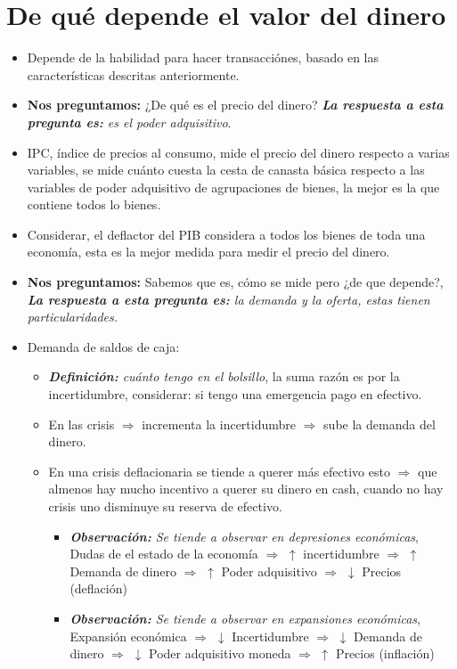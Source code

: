 \section{De qué depende el valor del dinero}
\begin{itemize}
    \item Depende de la habilidad para hacer transacciónes, basado en las características descritas anteriormente.
    \item \textbf{Nos preguntamos:} ¿De qué es el precio del dinero? \emph{\textbf{La respuesta a esta pregunta es: }es el poder adquisitivo}.
    \item IPC, índice de precios al consumo, mide el precio del dinero respecto a varias variables, se mide cuánto cuesta la cesta de canasta básica respecto a las variables de poder adquisitivo de agrupaciones de bienes, la mejor es la que contiene todos lo bienes.
    \item Considerar, el deflactor del PIB considera a todos los bienes de toda una economía, esta es la mejor medida para medir el precio del dinero.
    \item \textbf{Nos preguntamos:} Sabemos que es, cómo se mide pero ¿de que depende?, \emph{\textbf{La respuesta a esta pregunta es: }la demanda y la oferta, estas tienen particularidades.}
    \item Demanda de saldos de caja: 
        \begin{itemize}
            \item \emph{\textbf{Definición:} cuánto tengo en el bolsillo}, la suma razón es por la incertidumbre, considerar: si tengo una emergencia pago en efectivo.
            \item En las crisis $\Rightarrow$ incrementa la incertidumbre $\Rightarrow$ sube la demanda del dinero.
            \item En una crisis deflacionaria se tiende a querer más efectivo esto $\Rightarrow$ que almenos hay mucho incentivo a querer su dinero en cash, cuando no hay crisis uno disminuye su reserva de efectivo. 
            \begin{itemize}

                \item \emph{\textbf{Observación: }Se tiende a observar en depresiones económicas}, \newline  Dudas de el estado de la economía $\Rightarrow$  $\uparrow$ incertidumbre  $\Rightarrow$  $\uparrow$ Demanda de dinero $\Rightarrow$ $\uparrow$ Poder adquisitivo $\Rightarrow$  $\downarrow$ Precios (deflación) 
                
                \item \emph{\textbf{Observación: }Se tiende a observar en expansiones económicas}, \newline Expansión económica $\Rightarrow$ $\downarrow$ Incertidumbre $\Rightarrow$ $\downarrow$ Demanda de dinero $\Rightarrow$ $\downarrow$ Poder adquisitivo moneda $\Rightarrow$ $\uparrow$ Precios (inflación)
            \end{itemize}
        \end{itemize}
\end{itemize}






